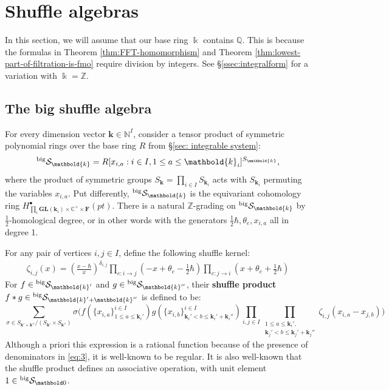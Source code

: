 \documentclass[11pt,reqno]{amsart}
\renewcommand{\mathbf}{\mathbold}
\numberwithin{equation}{section}
\theoremstyle{definition}
\newcommand{\bF}{\mathbf{F}}
\newcommand{\cS}{\mathcal{S}}
\newcommand{\bk}{\mathbf{k}}
\newcommand{\CC}{\mathbb{C}}
\newcommand{\NN}{\mathbb{N}}
\newcommand{\QQ}{\mathbb{Q}}
\newcommand{\ZZ}{\mathbb{Z}}
\newcommand{\leftexp}[2]{\vphantom{#2}^{#1} #2}
\newcommand{\GL}{\mathbf{GL}}
\newcommand{\kk}{\Bbbk}
\newcommand{\vertexset}{I}
\newcommand{\base}{R}
\newcommand{\preshu}{\leftexp{\mathrm{big}}{\cS}}
\begin{document}
\section{Shuffle algebras}
\label{sec: shuffle}

In this section, we will assume that our base ring $\kk$ contains $\QQ$. This is because the formulas in Theorem \ref{thm:FFT-homomorphism} and Theorem \ref{thm:lowest-part-of-filtration-is-fmo}
require division by integers. See \S \ref{ssec:integralform} for a variation with $\kk = \ZZ$.


\subsection{The big shuffle algebra}

For every dimension vector $\bk \in \NN^\vertexset$, consider a tensor product of symmetric polynomial rings over the base ring $\base$ from \S \ref{sec: integrable system}:
\begin{equation}
    \label{eq:preshu1}
    \preshu_\bk = \base[x_{i,a} : i \in \vertexset, 1 \leq a \leq \bk_i]^{S_\bk},
\end{equation}
where the product of symmetric groups $S_\bk = \prod_{i \in I} S_{\bk_i}$ acts with $S_{\bk_i}$ permuting the variables $x_{i,a}$.  
Put differently, $\preshu_\bk$ is the equivariant cohomology ring $H_{ \prod_i \GL(\bk_i) \times \CC^\times \times \bF}^\bullet(pt)$.  There is a natural $\ZZ$-grading on $\preshu_\bk$  by $\frac{1}{2}$-homological degree, or in other words with the generators $\frac{1}{2}\hbar, \theta_e, x_{i,a}$ all in degree 1.

For any pair of vertices $i,j \in \vertexset$, define the following shuffle kernel:
\begin{align}
  \label{eq:3}
  \zeta_{i,j}(x) = \left( \frac{x - \hbar}{x} \right)^{\delta_{i,j}} \prod_{ e : i \rightarrow j} (-x + \theta_e - \tfrac{1}{2} \hbar) \prod_{e:j \rightarrow i} (x + \theta_e + \tfrac{1}{2}\hbar)
\end{align}
For  $f\in \preshu_{\bk'}$ and $g \in \preshu_{\bk''}$, their \textbf{shuffle product} $f\ast g \in \preshu_{\bk'+\bk''}$ is defined to be:
\begin{equation}
    \label{eq:shuffleprod}    
    \sum_{\sigma \in S_{\bk'+\bk''}/(S_{\bk'} \times S_{\bk''})} \sigma \Bigg( f(\{x_{i,a}\}^{i\in \vertexset}_{1 \leq a \leq \bk_i'}) g(\{x_{i,b}\}^{i\in \vertexset}_{\bk_i' < b \leq \bk_i'+\bk_i''} ) \prod_{i,j \in \vertexset} \prod_{\substack{ 1 \leq a \leq \bk_i', \\ \bk_j' < b \leq \bk_j' + \bk_j''}} \zeta_{i,j}(x_{i,a} - x_{j,b})\Bigg)
\end{equation}
Although a priori this expression is a rational function because of the presence of denominators in \eqref{eq:3}, it is well-known to be regular.  It is also well-known that the shuffle product defines an associative operation, with unit element $1 \in \preshu_{\mathbf 0}$.
\end{document}
